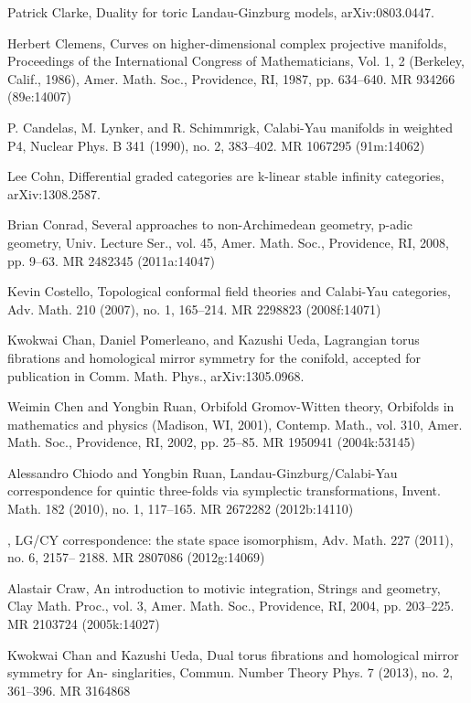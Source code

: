 {\begin{list}{}{%
  \setlength{\leftmargin}{3.4em}%
  \setlength{\itemindent}{-3.4em}%
  \setlength{\itemsep}{1.5pt}%
  \setlength{\parsep}{0pt}%
  \setlength{\listparindent}{0pt}%
}
\item[{[Cla]}] Patrick Clarke, Duality for toric Landau-Ginzburg models, arXiv:0803.0447.
\item[{[Cle87]}] Herbert Clemens, Curves on higher-dimensional complex projective manifolds, Proceedings of the International Congress of Mathematicians, Vol. 1, 2 (Berkeley, Calif., 1986), Amer. Math. Soc., Providence, RI, 1987, pp. 634--640. MR 934266 (89e:14007)
\item[{[CLS90]}] P. Candelas, M. Lynker, and R. Schimmrigk, Calabi-Yau manifolds in weighted P4, Nuclear Phys. B 341 (1990), no. 2, 383--402. MR 1067295 (91m:14062)
\item[{[Coh]}] Lee Cohn, Differential graded categories are k-linear stable infinity categories, arXiv:1308.2587.
\item[{[Con08]}] Brian Conrad, Several approaches to non-Archimedean geometry, p-adic geometry, Univ. Lecture Ser., vol. 45, Amer. Math. Soc., Providence, RI, 2008, pp. 9--63. MR 2482345 (2011a:14047)
\item[{[Cos07]}] Kevin Costello, Topological conformal field theories and Calabi-Yau categories, Adv. Math. 210 (2007), no. 1, 165--214. MR 2298823 (2008f:14071)
\item[{[CPU]}] Kwokwai Chan, Daniel Pomerleano, and Kazushi Ueda, Lagrangian torus fibrations and homological mirror symmetry for the conifold, accepted for publication in Comm. Math. Phys., arXiv:1305.0968.
\item[{[CR02]}] Weimin Chen and Yongbin Ruan, Orbifold Gromov-Witten theory, Orbifolds in mathematics and physics (Madison, WI, 2001), Contemp. Math., vol. 310, Amer. Math. Soc., Providence, RI, 2002, pp. 25--85. MR 1950941 (2004k:53145)
\item[{[CR10]}] Alessandro Chiodo and Yongbin Ruan, Landau-Ginzburg/Calabi-Yau correspondence for quintic three-folds via symplectic transformations, Invent. Math. 182 (2010), no. 1, 117--165. MR 2672282 (2012b:14110)
\item[{[CR11]}] , LG/CY correspondence: the state space isomorphism, Adv. Math. 227 (2011), no. 6, 2157-- 2188. MR 2807086 (2012g:14069)
\item[{[Cra04]}] Alastair Craw, An introduction to motivic integration, Strings and geometry, Clay Math. Proc., vol. 3, Amer. Math. Soc., Providence, RI, 2004, pp. 203--225. MR 2103724 (2005k:14027)
\item[{[CU13]}] Kwokwai Chan and Kazushi Ueda, Dual torus fibrations and homological mirror symmetry for An- singlarities, Commun. Number Theory Phys. 7 (2013), no. 2, 361--396. MR 3164868

\end{list}}
